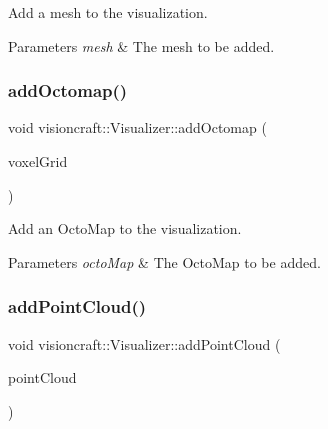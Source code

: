 Add a mesh to the visualization. 


\begin{DoxyParams}{Parameters}
{\em mesh} & The mesh to be added. \\
\hline
\end{DoxyParams}
\mbox{\label{classvisioncraft_1_1Visualizer_a69a0d51b72b3fca0092577083557a9e6}} 
\subsubsection{\texorpdfstring{add\+Octomap()}{addOctomap()}}
{\footnotesize\ttfamily void visioncraft\+::\+Visualizer\+::add\+Octomap (\begin{DoxyParamCaption}\item[{const std\+::shared\+\_\+ptr$<$ open3d\+::geometry\+::\+Voxel\+Grid $>$ \&}]{voxel\+Grid }\end{DoxyParamCaption})}



Add an Octo\+Map to the visualization. 


\begin{DoxyParams}{Parameters}
{\em octo\+Map} & The Octo\+Map to be added. \\
\hline
\end{DoxyParams}
\mbox{\label{classvisioncraft_1_1Visualizer_a7e36fb4fdc5aadc474b5163e6a53f921}} 
\subsubsection{\texorpdfstring{add\+Point\+Cloud()}{addPointCloud()}}
{\footnotesize\ttfamily void visioncraft\+::\+Visualizer\+::add\+Point\+Cloud (\begin{DoxyParamCaption}\item[{const std\+::shared\+\_\+ptr$<$ open3d\+::geometry\+::\+Point\+Cloud $>$ \&}]{point\+Cloud }\end{DoxyParamCaption})}



